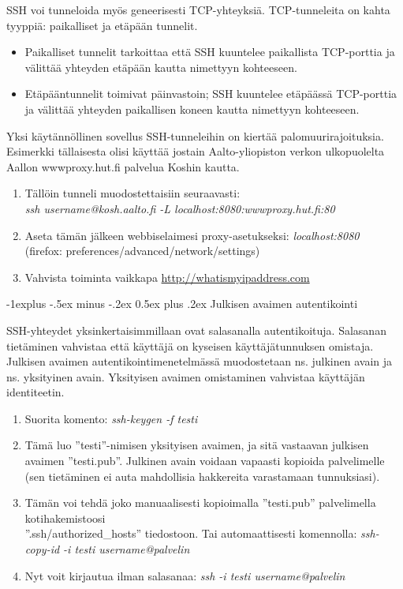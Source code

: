 \documentclass[12pt,portrait,a4]{article}
\makeatletter
\renewcommand{\subsection}{\@startsection{subsection}{2}{0mm}%
                                {-1explus -.5ex minus -.2ex}%
                                {0.5ex plus .2ex}%
                                {\normalfont\normalsize\bfseries}}
\makeatother
\begin{document}
SSH voi tunneloida myös geneerisesti TCP-yhteyksiä.
TCP-tunneleita on kahta tyyppiä: paikalliset ja etäpään tunnelit.

\begin{itemize}
\item Paikalliset tunnelit tarkoittaa että SSH kuuntelee paikallista TCP-porttia
ja välittää yhteyden etäpään kautta nimettyyn kohteeseen.
\item Etäpääntunnelit toimivat päinvastoin; SSH kuuntelee etäpäässä TCP-porttia
ja välittää yhteyden paikallisen koneen kautta nimettyyn kohteeseen.
\end{itemize}

Yksi käytännöllinen sovellus SSH-tunneleihin on kiertää palomuurirajoituksia.
Esimerkki tällaisesta olisi käyttää jostain Aalto-yliopiston verkon
ulkopuolelta Aallon wwwproxy.hut.fi palvelua Koshin kautta.

\begin{enumerate}
\item Tällöin tunneli muodostettaisiin seuraavasti:
 \\ \emph{ssh username@kosh.aalto.fi -L localhost:8080:wwwproxy.hut.fi:80}
\item Aseta tämän jälkeen webbiselaimesi proxy-asetukseksi: \emph{localhost:8080}
 \\ (firefox: preferences/advanced/network/settings)
\item Vahvista toiminta vaikkapa \url{http://whatismyipaddress.com}
\end{enumerate}

\subsection{Julkisen avaimen autentikointi}

SSH-yhteydet yksinkertaisimmillaan ovat salasanalla autentikoituja.
Salasanan tietäminen vahvistaa että käyttäjä on kyseisen käyttäjätunnuksen
omistaja.  Julkisen avaimen autentikointimenetelmässä muodostetaan ns.
julkinen avain ja ns. yksityinen avain.  Yksityisen avaimen omistaminen
vahvistaa käyttäjän identiteetin.

\begin{enumerate}
\item Suorita komento: \emph{ssh-keygen -f testi}
\item Tämä luo ''testi''-nimisen yksityisen avaimen, ja sitä vastaavan julkisen
avaimen ''testi.pub''.  Julkinen avain voidaan vapaasti kopioida palvelimelle
(sen tietäminen ei auta mahdollisia hakkereita varastamaan tunnuksiasi).
\item Tämän voi tehdä joko manuaalisesti kopioimalla ''testi.pub'' palvelimella
kotihakemistoosi \\ ''.ssh/authorized\_hosts'' tiedostoon.  Tai automaattisesti
komennolla: \emph{ssh-copy-id -i testi username@palvelin}
\item Nyt voit kirjautua ilman salasanaa: \emph{ssh -i testi username@palvelin}
\end{enumerate}
\end{document}
